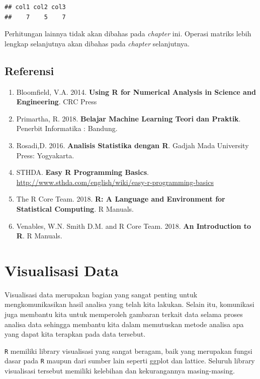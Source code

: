 \documentclass[
]{book}
\providecommand{\tightlist}{%
  \setlength{\itemsep}{0pt}\setlength{\parskip}{0pt}}
\theoremstyle{definition}
\theoremstyle{definition}
\theoremstyle{definition}
\theoremstyle{definition}
\theoremstyle{remark}
\begin{document}
\begin{verbatim}
## col1 col2 col3 
##    7    5    7
\end{verbatim}

Perhitungan lainnya tidak akan dibahas pada \emph{chapter} ini. Operasi matriks lebih lengkap selanjutnya akan dibahas pada \emph{chapter} selanjutnya.

\hypertarget{referensi-1}{%
\section{Referensi}\label{referensi-1}}

\begin{enumerate}
\def\labelenumi{\arabic{enumi}.}
\tightlist
\item
  Bloomfield, V.A. 2014. \textbf{Using R for Numerical Analysis in Science and Engineering}. CRC Press
\item
  Primartha, R. 2018. \textbf{Belajar Machine Learning Teori dan Praktik}. Penerbit Informatika : Bandung.
\item
  Rosadi,D. 2016. \textbf{Analisis Statistika dengan R}. Gadjah Mada University Press: Yogyakarta.
\item
  STHDA. \textbf{Easy R Programming Basics}. \url{http://www.sthda.com/english/wiki/easy-r-programming-basics}
\item
  The R Core Team. 2018. \textbf{R: A Language and Environment for Statistical Computing}. R Manuals.
\item
  Venables, W.N. Smith D.M. and R Core Team. 2018. \textbf{An Introduction to R}. R Manuals.
\end{enumerate}

\hypertarget{dataviz}{%
\chapter{Visualisasi Data}\label{dataviz}}

Visualisasi data merupakan bagian yang sangat penting untuk mengkomunikasikan hasil analisa yang telah kita lakukan. Selain itu, komunikasi juga membantu kita untuk memperoleh gambaran terkait data selama proses analisa data sehingga membantu kita dalam memutuskan metode analisa apa yang dapat kita terapkan pada data tersebut.

\texttt{R} memiliki library visualisasi yang sangat beragam, baik yang merupakan fungsi dasar pada \texttt{R} maupun dari sumber lain seperti ggplot dan lattice. Seluruh library visualisasi tersebut memiliki kelebihan dan kekurangannya masing-masing.
\end{document}
